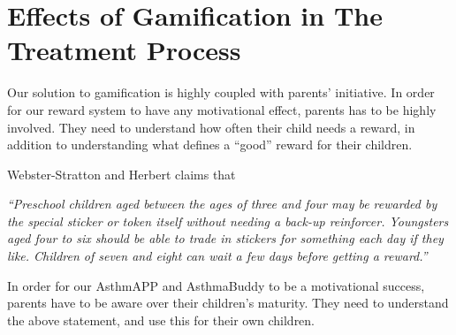 \section{Effects of Gamification in The Treatment Process}
Our solution to gamification is highly coupled with parents' initiative. In order for our reward system to have any motivational effect, parents has to be highly involved. They need to understand how often their child needs a reward, in addition to understanding what defines a ``good'' reward for their children. 

Webster-Stratton and Herbert claims that

\textit{``Preschool children aged between the ages of three and four may be rewarded by the special sticker or token itself without needing a back-up reinforcer. Youngsters aged four to six should be able to trade in stickers for something each day if they like. Children of seven and eight can wait a few days before getting a reward.''} \cite{webster1994troubled}

In order for our AsthmAPP and AsthmaBuddy to be a motivational success, parents have to be aware over their children's maturity. They need to understand the above statement, and use this for their own children. 